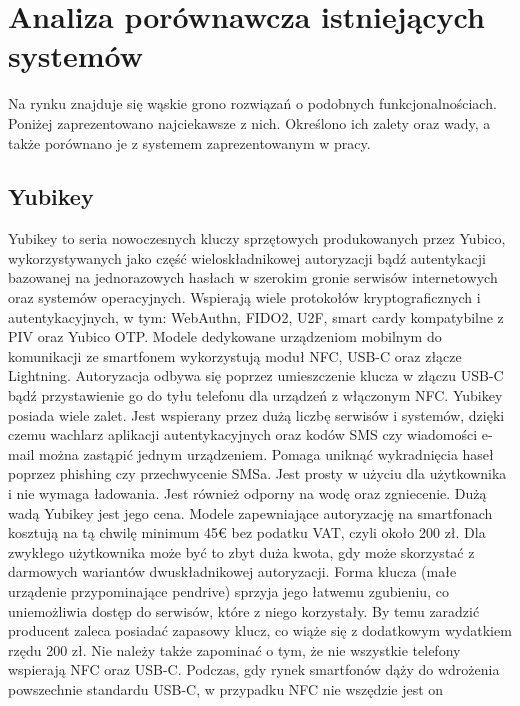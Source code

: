 \section{Analiza porównawcza istniejących systemów}
Na rynku znajduje się wąskie grono rozwiązań o podobnych funkcjonalnościach. Poniżej zaprezentowano najciekawsze z nich. Określono ich zalety oraz
wady, a także porównano je z systemem zaprezentowanym w pracy.
\subsection{Yubikey}
Yubikey \cite{Yubikey} to seria nowoczesnych kluczy sprzętowych produkowanych przez Yubico, wykorzystywanych jako część wieloskładnikowej autoryzacji bądź autentykacji
bazowanej na jednorazowych hasłach w szerokim gronie serwisów internetowych oraz systemów operacyjnych. Wspierają wiele protokołów kryptograficznych
i autentykacyjnych, w tym: WebAuthn, FIDO2, U2F, smart cardy kompatybilne z PIV oraz Yubico OTP. Modele dedykowane urządzeniom mobilnym 
do komunikacji ze smartfonem wykorzystują moduł NFC, USB-C oraz złącze Lightning. Autoryzacja odbywa się poprzez umieszczenie klucza w złączu USB-C
bądź przystawienie go do tyłu telefonu dla urządzeń z włączonym NFC.
\newline\newline
\indent Yubikey posiada wiele zalet. Jest wspierany przez dużą liczbę serwisów i systemów, dzięki czemu wachlarz aplikacji autentykacyjnych oraz kodów SMS
czy wiadomości e-mail można zastąpić jednym urządzeniem. Pomaga uniknąć wykradnięcia haseł poprzez phishing czy przechwycenie SMSa. Jest prosty w
użyciu dla użytkownika i nie wymaga ładowania. Jest również odporny na wodę oraz zgniecenie.
\newline\newline
\indent Dużą wadą Yubikey jest jego cena. Modele zapewniające autoryzację na smartfonach kosztują na tą chwilę minimum 45€ bez podatku VAT\cite{Yubi-Price}, czyli około 200 zł.
Dla zwykłego użytkownika może być to zbyt duża kwota, gdy może skorzystać z darmowych wariantów dwuskładnikowej autoryzacji. Forma klucza
(małe urządenie przypominające pendrive) sprzyja jego łatwemu zgubieniu, co uniemożliwia dostęp do serwisów, które z niego korzystały. By temu
zaradzić producent zaleca posiadać zapasowy klucz, co wiąże się z dodatkowym wydatkiem rzędu 200 zł. Nie należy także zapominać o tym, że nie wszystkie
telefony wspierają NFC oraz USB-C. Podczas, gdy rynek smartfonów dąży do wdrożenia powszechnie standardu USB-C, w przypadku NFC nie wszędzie jest on
